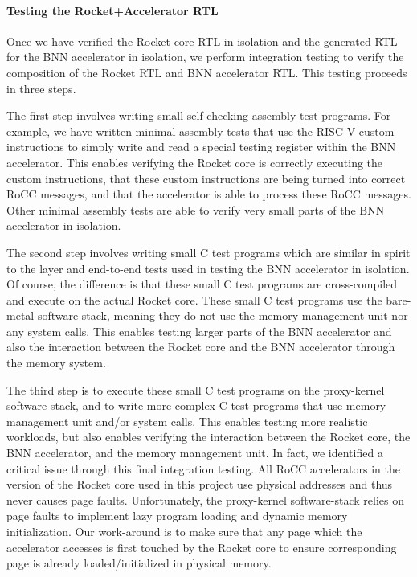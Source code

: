 \paragraph{Testing the Rocket+Accelerator RTL}
Once we have verified the Rocket core RTL in isolation and the generated
RTL for the BNN accelerator in isolation, we perform integration testing
to verify the composition of the Rocket RTL and BNN accelerator RTL. This
testing proceeds in three steps.

The first step involves writing small self-checking assembly test
programs. For example, we have written minimal assembly tests that use
the RISC-V custom instructions to simply write and read a special testing
register within the BNN accelerator. This enables verifying the Rocket
core is correctly executing the custom instructions, that these custom
instructions are being turned into correct RoCC messages, and that the
accelerator is able to process these RoCC messages. Other minimal
assembly tests are able to verify very small parts of the BNN accelerator
in isolation.

The second step involves writing small C test programs which are similar
in spirit to the layer and end-to-end tests used in testing the BNN
accelerator in isolation. Of course, the difference is that these small C
test programs are cross-compiled and execute on the actual Rocket core.
These small C test programs use the bare-metal software stack, meaning
they do not use the memory management unit nor any system calls. This
enables testing larger parts of the BNN accelerator and also the
interaction between the Rocket core and the BNN accelerator through the
memory system.

The third step is to execute these small C test programs on the
proxy-kernel software stack, and to write more complex C test programs
that use memory management unit and/or system calls. This enables testing
more realistic workloads, but also enables verifying the interaction
between the Rocket core, the BNN accelerator, and the memory management
unit. In fact, we identified a critical issue through this final
integration testing. All RoCC accelerators in the version of the Rocket
core used in this project use physical addresses and thus never causes
page faults. Unfortunately, the proxy-kernel software-stack relies on
page faults to implement lazy program loading and dynamic memory
initialization. Our work-around is to make sure that any page which the
accelerator accesses is first touched by the Rocket core to ensure
corresponding page is already loaded/initialized in physical memory.

